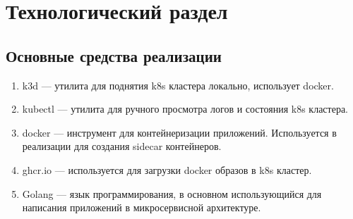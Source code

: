 \chapter{Технологический раздел}

\section{Основные средства реализации}

\begin{enumerate}
\item k3d --- утилита для поднятия k8s кластера локально, использует docker. %
\item kubectl --- утилита для ручного просмотра логов и состояния k8s кластера.
\item docker --- инструмент для контейнеризации приложений. Используется в реализации для создания sidecar контейнеров.
\item ghcr.io --- используется для загрузки docker образов в k8s кластер.
\item Golang --- язык программирования, в основном использующийся для написания приложений в микросервисной архитектуре. %

\end{enumerate}

%	
%
%
